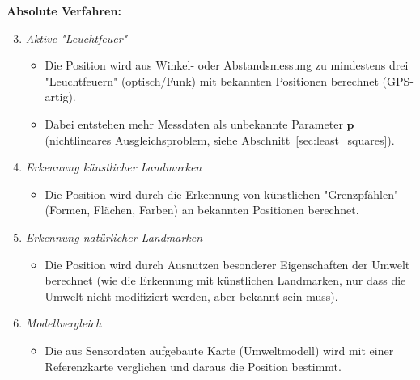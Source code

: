 \documentclass[a4paper, 11pt, accentcolor = tud3b]{tudreport}
\renewcommand{\vec}[1]{\boldsymbol{#1}}
\begin{document}
			\textbf{Absolute Verfahren:}
			\begin{enumerate} \setcounter{enumi}{2}
				\item \emph{Aktive "Leuchtfeuer"}
					\begin{itemize}
						\item Die Position wird aus Winkel- oder Abstandsmessung zu mindestens drei "Leuchtfeuern" (optisch/Funk) mit bekannten Positionen berechnet (GPS-artig).
						\item Dabei entstehen mehr Messdaten als unbekannte Parameter \(\vec{p}\) (nichtlineares Ausgleichsproblem, siehe Abschnitt~\ref{sec:least_squares}).
					\end{itemize}
				\item \emph{Erkennung künstlicher Landmarken}
					\begin{itemize}
						\item Die Position wird durch die Erkennung von künstlichen "Grenzpfählen" (Formen, Flächen, Farben) an bekannten Positionen berechnet.
					\end{itemize}
				\item \emph{Erkennung natürlicher Landmarken}
					\begin{itemize}
						\item Die Position wird durch Ausnutzen besonderer Eigenschaften der Umwelt berechnet (wie die Erkennung mit künstlichen Landmarken, nur dass die Umwelt nicht modifiziert werden, aber bekannt sein muss).
					\end{itemize}
				\item \emph{Modellvergleich}
					\begin{itemize}
						\item Die aus Sensordaten aufgebaute Karte (Umweltmodell) wird mit einer Referenzkarte verglichen und daraus die Position bestimmt.
					\end{itemize}
			\end{enumerate}
		
\end{document}
